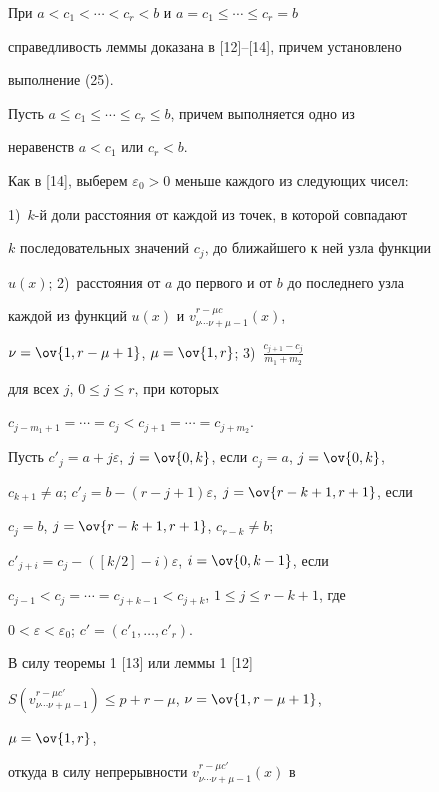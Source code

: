 \begin{pf} При $a<c_1<\dotsb<c_r<b$ и $a=c_1\le\dotsb\le c_r=b$ 


справедливость леммы доказана в [12]--[14], причем установлено 


выполнение (25). 


 


Пусть $a\le c_1\le\dotsb\le c_r\le b$, причем выполняется одно из 


неравенств $a<c_1$ или $c_r<b$. 


 


Как в [14], выберем $\varepsilon_0>0$ меньше каждого из следующих чисел: 


1)~$k$-й доли расстояния от каждой из точек, в которой совпадают 


$k$ последовательных значений $c_j$, до ближайшего к ней узла функции 


$u(x)$; 2)~расстояния от $a$ до первого и от $b$ до последнего узла 


каждой из функций $u(x)$ и $v^{r-\mu c}_{\nu\dotsb\nu+\mu-1}(x)$, 


$\nu=\ov{1,r-\mu+1}$, $\mu=\ov{1,r}$; 3)~$\frac{c_{j+1}-c_j}{m_1+m_2}$ 


для всех $j$, $0\le j\le r$, при которых 


$c_{j-m_1+1}=\dotsb=c_j<c_{j+1}=\dotsb=c_{j+m_2}$. 


 


Пусть $c'_j=a+j\varepsilon$, $j=\ov{0,k}$, если $c_j=a$, $j=\ov{0,k}$, 


$c_{k+1}\ne a$; $c'_j=b-(r-j+1)\varepsilon$, $j=\ov{r-k+1,r+1}$, если 


$c_j=b$, $j=\ov{r-k+1,r+1}$, $c_{r-k}\ne b$; 


$c'_{j+i}=c_j-([k/2]-i)\varepsilon$, $i=\ov{0,k-1}$, если 


$c_{j-1}<c_j=\dotsb=c_{j+k-1}<c_{j+k}$, $1\le j\le r-k+1$, где 


$0<\varepsilon<\varepsilon_0$; $c'=(c'_1,\dotsc,c'_r)$. 


 


В силу теоремы 1 [13] или леммы 1 [12] 


$S(v^{r-\mu c'}_{\nu\dotsb\nu+\mu-1})\le p+r-\mu$, $\nu=\ov{1,r-\mu+1}$, 


$\mu=\ov{1,r}$, 


откуда в силу непрерывности $v^{r-\mu c'}_{\nu\dotsb\nu+\mu-1}(x)$ в 



\end{pf}
